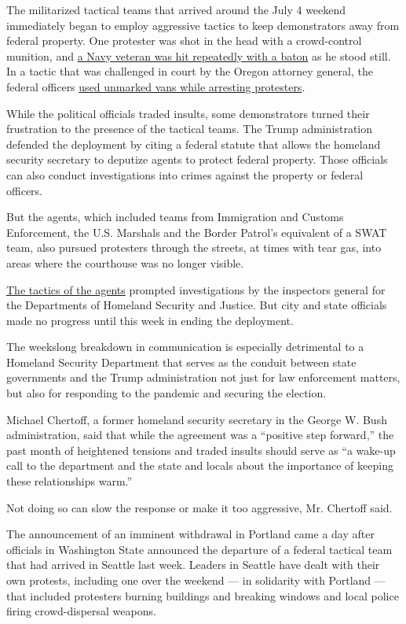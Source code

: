 The militarized tactical teams that arrived around the July 4 weekend
immediately began to employ aggressive tactics to keep demonstrators
away from federal property. One protester was shot in the head with a
crowd-control munition, and
\href{https://www.nytimes.com/2020/07/20/us/portland-protests-navy-christopher-david.html}{a
Navy veteran was hit repeatedly with a baton} as he stood still. In a
tactic that was challenged in court by the Oregon attorney general, the
federal officers
\href{https://www.nytimes.com/2020/07/17/us/portland-protests.html}{used
unmarked vans while arresting protesters}.

While the political officials traded insults, some demonstrators turned
their frustration to the presence of the tactical teams. The Trump
administration defended the deployment by citing a federal statute that
allows the homeland security secretary to deputize agents to protect
federal property. Those officials can also conduct investigations into
crimes against the property or federal officers.

But the agents, which included teams from Immigration and Customs
Enforcement, the U.S. Marshals and the Border Patrol's equivalent of a
SWAT team, also pursued protesters through the streets, at times with
tear gas, into areas where the courthouse was no longer visible.

\href{https://www.nytimes.com/2020/07/25/us/portland-federal-legal-jurisdiction-courts.html}{The
tactics of the agents} prompted investigations by the inspectors general
for the Departments of Homeland Security and Justice. But city and state
officials made no progress until this week in ending the deployment.

The weekslong breakdown in communication is especially detrimental to a
Homeland Security Department that serves as the conduit between state
governments and the Trump administration not just for law enforcement
matters, but also for responding to the pandemic and securing the
election.

Michael Chertoff, a former homeland security secretary in the George W.
Bush administration, said that while the agreement was a ``positive step
forward,'' the past month of heightened tensions and traded insults
should serve as ``a wake-up call to the department and the state and
locals about the importance of keeping these relationships warm.''

Not doing so can slow the response or make it too aggressive, Mr.
Chertoff said.

The announcement of an imminent withdrawal in Portland came a day after
officials in Washington State announced the departure of a federal
tactical team that had arrived in Seattle last week. Leaders in Seattle
have dealt with their own protests, including one over the weekend ---
in solidarity with Portland --- that included protesters burning
buildings and breaking windows and local police firing crowd-dispersal
weapons.

